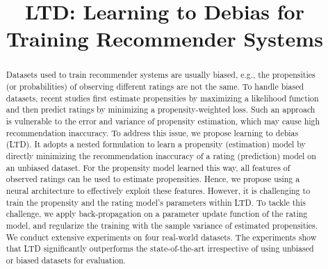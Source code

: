 \documentclass[letterpaper]{article} %
\begin{document}
%

\title{LTD: Learning to Debias for Training Recommender Systems}
\author{}
\maketitle


\begin{abstract}
Datasets used to train recommender systems are usually biased, e.g., the propensities (or probabilities) of observing different ratings are not the same. To handle biased datasets, recent studies first estimate propensities by maximizing a likelihood function and then predict ratings by minimizing a propensity-weighted loss. Such an approach is vulnerable to the error and variance of propensity estimation, which may cause high recommendation inaccuracy. To address this issue, we propose learning to debias (LTD). It adopts a nested formulation to learn a propensity (estimation) model by directly minimizing the recommendation inaccuracy of a rating (prediction) model on an unbiased dataset. For the propensity model learned this way, all features of observed ratings can be used to estimate propensities. Hence, we propose using a neural architecture to effectively exploit these features. However, it is challenging to train the propensity and the rating model's parameters within LTD. To tackle this challenge, we apply back-propagation on a parameter update function of the rating model, and regularize the training with the sample variance of estimated propensities. We conduct extensive experiments on four real-world datasets. The experiments show that LTD significantly outperforms the state-of-the-art irrespective of using unbiased or biased datasets for evaluation.
\end{abstract}
\end{document}
